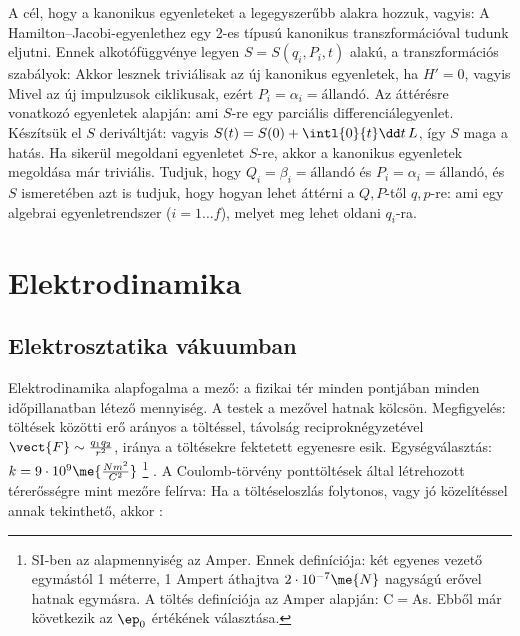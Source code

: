    A cél, hogy a kanonikus egyenleteket a legegyszerűbb alakra hozzuk, vagyis:
   A Hamilton--Jacobi-egyenlethez egy 2-es típusú kanonikus transzformációval tudunk eljutni.
   Ennek alkotófüggvénye legyen $S=S(q_i,P_i,t)$ alakú, a transzformációs szabályok:
   Akkor lesznek triviálisak az új kanonikus egyenletek, ha $H'=0$, vagyis 
   Mivel az új impulzusok ciklikusak, ezért $P_i=\alpha_i=\text{állandó}$.
   Az áttérésre vonatkozó egyenletek alapján:
   ami $S$-re egy parciális differenciálegyenlet.
   Készítsük el $S$ deriváltját:
   vagyis $S(t)=S(0)+\intl{0}{t}\dd t\,L$, így $S$ maga a hatás.
   Ha sikerül megoldani  egyenletet $S$-re, akkor a kanonikus egyenletek megoldása már triviális.
   Tudjuk, hogy $Q_i=\beta_i=\text{állandó}$ és $P_i=\alpha_i=\text{állandó}$, és $S$ ismeretében azt is tudjuk, hogy hogyan lehet áttérni a $Q,P$-től $q,p$-re:
   ami egy algebrai egyenletrendszer ($i=1\dots f$), melyet meg lehet oldani $q_i$-ra.
   
 \section{Elektrodinamika}
  
  \subsection{Elektrosztatika vákuumban}\label{ss:01-CoulombMaxwell}
   
   Elektrodinamika alapfogalma a mező: a fizikai tér minden pontjában minden időpillanatban létező mennyiség.
   A testek a mezővel hatnak kölcsön.
   Megfigyelés: töltések közötti erő arányos a töltéssel, távolság reciproknégyzetével $\vect{F}\sim\frac{q_1q_2}{r^2}$, iránya a töltésekre fektetett egyenesre esik.  Egységválasztás: $k=9\cdot 10^9\me{\frac{Nm^2}{C^2}}$
   \footnote{SI-ben az alapmennyiség az Amper.
   Ennek definíciója: két egyenes vezető egymástól 1 méterre, 1 Ampert áthajtva $2\cdot 10^{-7}\me{N}$ nagyságú erővel hatnak egymásra.
   A töltés definíciója az Amper alapján: C$=$As.
   Ebből már következik az $\ep_0$ értékének választása.}
   .
   A Coulomb-törvény ponttöltések által létrehozott térerősségre mint mezőre felírva:
   Ha a töltéseloszlás folytonos, vagy jó közelítéssel annak tekinthető, akkor :
   
